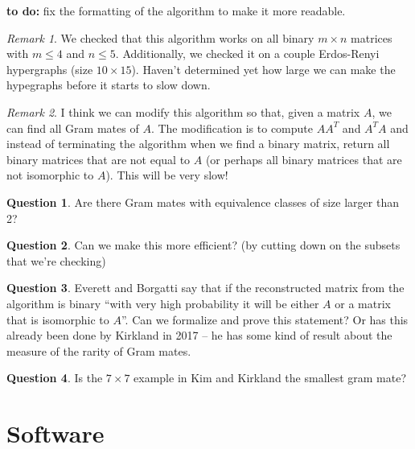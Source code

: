 \documentclass[11pt]{article}
\theoremstyle{definition}
\newtheorem{question}{Question}
\theoremstyle{remark}
\newtheorem{remark}{Remark}
\begin{document}
{\bf to do:} fix the formatting of the algorithm to make it more readable. 
	
\begin{remark}
We checked that this algorithm works on all binary $m \times n$ matrices with $m \leq 4$ and $n \leq 5$. Additionally, we checked it on a couple Erdos-Renyi hypergraphs (size $10 \times 15$). Haven't determined yet how large we can make the hypegraphs before it starts to slow down. 
\end{remark}
	
\begin{remark}
I think we can modify this algorithm so that, given a matrix $A$, we can find all Gram mates of $A$. The modification is to compute $AA^{T}$ and $A^{T}A$ and instead of terminating the algorithm when we find a binary matrix, return all binary matrices that are not equal to $A$ (or perhaps all binary matrices that are not isomorphic to $A$). This will be very slow!
\end{remark}

\begin{question}
Are there Gram mates with equivalence classes of size larger than 2?
\end{question}

\begin{question}
Can we make this more efficient? (by cutting down on the subsets that we're checking)
\end{question}

\begin{question}
Everett and Borgatti say that if the reconstructed matrix from the algorithm is binary ``with very high probability it will be either $A$ or a matrix that is isomorphic to $A$''. Can we formalize and prove this statement? Or has this already been done by Kirkland in 2017 -- he has some kind of result about the measure of the rarity of Gram mates. 
\end{question}

\begin{question}
Is the $7 \times 7$ example in Kim and Kirkland \cite{Kirkland} the smallest gram mate?
\end{question}



\section{Software}




\end{document}
